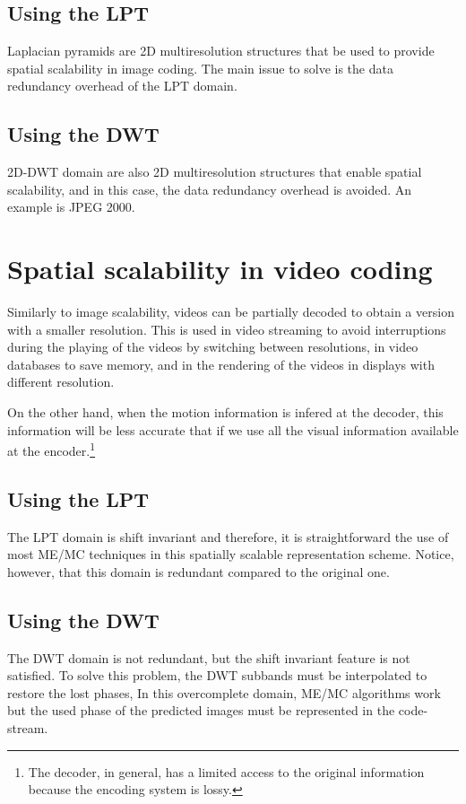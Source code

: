 \subsection{Using the LPT}

Laplacian pyramids are 2D multiresolution structures that be used to
provide spatial scalability in image coding. The main issue to solve
is the data redundancy overhead of the LPT domain.

\subsection{Using the DWT}

2D-DWT domain are also 2D multiresolution structures that enable
spatial scalability, and in this case, the data redundancy overhead is
avoided. An example is JPEG 2000.

\section{Spatial scalability in video coding}

Similarly to image scalability, videos can be partially decoded to
obtain a version with a smaller resolution. This is used in video
streaming to avoid interruptions during the playing of the videos by
switching between resolutions, in video databases to save memory, and
in the rendering of the videos in displays with different resolution.

On the other hand, when the motion information is infered at the
decoder, this information will be less accurate that if we use all the
visual information available at the encoder.\footnote{The decoder, in
general, has a limited access to the original information because the
encoding system is lossy.}

\subsection{Using the LPT}

The LPT domain is shift invariant and therefore, it is straightforward
the use of most ME/MC techniques in this spatially scalable
representation scheme. Notice, however, that this domain is redundant
compared to the original one.

\subsection{Using the DWT}

The DWT domain is not redundant, but the shift invariant feature is
not satisfied. To solve this problem, the DWT subbands must be
interpolated to restore the lost phases, In this overcomplete domain,
ME/MC algorithms work but the used phase of the predicted images must
be represented in the code-stream.

